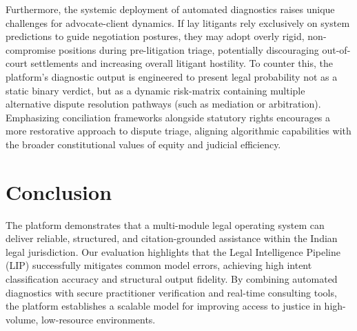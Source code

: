 \documentclass[conference]{IEEEtran}
\begin{document}
Furthermore, the systemic deployment of automated diagnostics raises unique challenges for advocate-client dynamics. If lay litigants rely exclusively on system predictions to guide negotiation postures, they may adopt overly rigid, non-compromise positions during pre-litigation triage, potentially discouraging out-of-court settlements and increasing overall litigant hostility. To counter this, the platform's diagnostic output is engineered to present legal probability not as a static binary verdict, but as a dynamic risk-matrix containing multiple alternative dispute resolution pathways (such as mediation or arbitration). Emphasizing conciliation frameworks alongside statutory rights encourages a more restorative approach to dispute triage, aligning algorithmic capabilities with the broader constitutional values of equity and judicial efficiency.

\section{Conclusion}
\label{sec:conclusion}
The platform demonstrates that a multi-module legal operating system can deliver reliable, structured, and citation-grounded assistance within the Indian legal jurisdiction. Our evaluation highlights that the Legal Intelligence Pipeline (LIP) successfully mitigates common model errors, achieving high intent classification accuracy and structural output fidelity. By combining automated diagnostics with secure practitioner verification and real-time consulting tools, the platform establishes a scalable model for improving access to justice in high-volume, low-resource environments.
\end{document}
